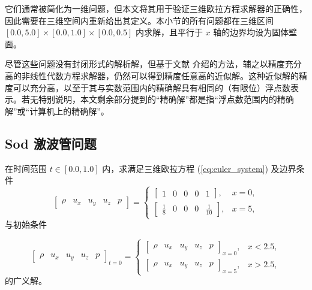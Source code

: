 它们通常被简化为一维问题，但本文将其用于验证三维欧拉方程求解器的正确性，因此需要在三维空间内重新给出其定义。本小节的所有问题都在三维区间
$[0.0,5.0]\times[0.0,1.0]\times[0.0,0.5]$ 内求解，且平行于 $x$ 轴的边界均设为固体壁面。

尽管这些问题没有封闭形式的解析解，但基于文献 \cite{Toro_2009} 介绍的方法，辅之以精度充分高的非线性代数方程求解器，仍然可以得到精度任意高的近似解。这种近似解的精度可以充分高，以至于其与实数范围内的精确解具有相同的（有限位）浮点数表示。若无特别说明，本文剩余部分提到的“精确解”都是指“浮点数范围内的精确解”或“计算机上的精确解”。

\subsection{Sod 激波管问题}
\begin{problem}
\label{prob:Sod-=006FC0=006CE2=007BA1}在时间范围 $t\in[0.0,1.0]$
内，求满足三维欧拉方程 (\ref{eq:euler_system}) 及边界条件
\begin{equation}
\begin{bmatrix}\rho & u_{x} & u_{y} & u_{z} & p\end{bmatrix}=\begin{cases}
\begin{bmatrix}1 & 0 & 0 & 0 & 1\end{bmatrix}, & x=0,\\
\begin{bmatrix}\frac{1}{8} & 0 & 0 & 0 & \frac{1}{10}\end{bmatrix}, & x=5,
\end{cases}
\end{equation}
与初始条件

\newpage{}

\begin{equation}
\begin{bmatrix}\rho & u_{x} & u_{y} & u_{z} & p\end{bmatrix}_{t=0}=\begin{cases}
\begin{bmatrix}\rho & u_{x} & u_{y} & u_{z} & p\end{bmatrix}_{x=0}, & x<2.5,\\
\begin{bmatrix}\rho & u_{x} & u_{y} & u_{z} & p\end{bmatrix}_{x=5}, & x>2.5,
\end{cases}
\end{equation}
的广义解。
\end{problem}

